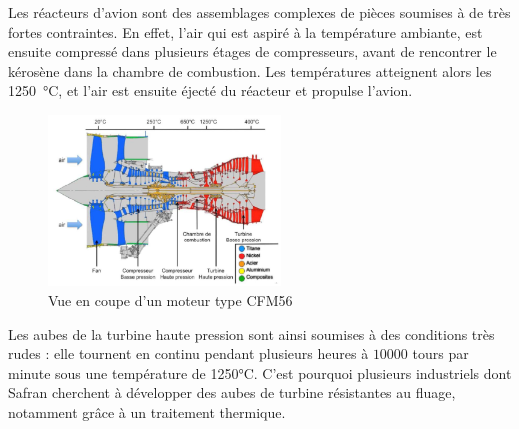 
Les réacteurs d'avion sont des assemblages complexes de pièces soumises à de
très fortes contraintes. En effet, l'air qui est aspiré à la température 
ambiante, est ensuite compressé dans plusieurs étages de compresseurs, 
avant de rencontrer le kérosène dans la chambre de combustion. Les températures
atteignent alors les \SI{1250}{\celsius}, et l'air est ensuite éjecté du réacteur
et propulse l'avion.


\begin{figure}[htbp]
    \centering
    \includegraphics[width=0.55\textwidth]{images/coupe_CFM56.png}
    \caption{Vue en coupe d'un moteur type CFM56}
    \label{<label>}
\end{figure}


Les aubes de la turbine haute pression sont ainsi soumises à des conditions très rudes : elle tournent en continu pendant plusieurs heures à $10000$ tours par minute sous une température de 1250°C. C'est pourquoi plusieurs industriels dont Safran cherchent à développer des aubes de turbine résistantes au fluage, notamment grâce à un traitement thermique.


